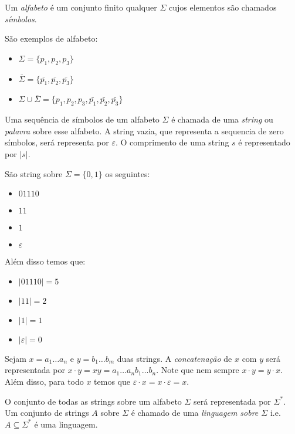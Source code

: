 Um {\em alfabeto} é um conjunto finito qualquer $\Sigma$ cujos elementos são chamados {\em símbolos}.


\begin{example}
  São exemplos de alfabeto:
\begin{itemize}
\item[] $\Sigma = \{p_1, p_2, p_3\}$
\item[] $\overline{\Sigma} = \{\bar{p_1}, \bar{p_2}, \bar{p_3}\}$
\item[] $\Sigma \cup \overline{\Sigma} = \{p_1, p_2, p_3, \bar{p_1}, \bar{p_2}, \bar{p_3}\}$
\end{itemize}

\end{example}

Uma sequência de símbolos de um alfabeto $\Sigma$ é chamada de uma {\em string} ou {\em palavra} sobre esse alfabeto.
A string vazia, que representa a sequencia de zero símbolos, será representa por $\varepsilon$.
O comprimento de uma string $s$ é representado por $|s|$.

\begin{example}
  São string sobre $\Sigma = \{0,1\}$ os seguintes:
\begin{itemize}
\item[] $01110$
\item[] $11$
\item[] $1$
\item[] $\varepsilon$
\end{itemize}

Além disso temos que:
\begin{itemize}
\item[] $|01110| = 5$
\item[] $|11| = 2$
\item[] $|1| = 1$
\item[] $|\varepsilon| = 0$
\end{itemize}
\end{example}

Sejam $x = a_1 \dots a_n$ e $y = b_1 \dots b_m$ duas strings.
A {\em concatenação} de $x$ com $y$ será representada por $x \cdot y = xy = a_1\dots a_n b_1 \dots b_n$.
Note que nem sempre $x \cdot y = y \cdot x$.
Além disso, para todo $x$ temos que $\varepsilon \cdot x = x \cdot \varepsilon = x$.

O conjunto de todas as strings sobre um alfabeto $\Sigma$ será representada por $\Sigma^*$.
Um conjunto de strings $A$ sobre $\Sigma$ é chamado de uma {\em linguagem sobre $\Sigma$} i.e. $A \subseteq \Sigma^*$ é uma linguagem.

